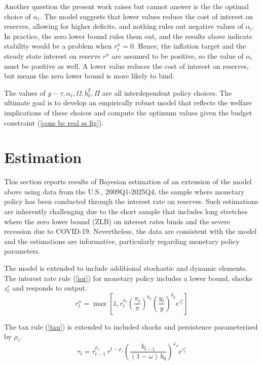 \documentclass[]{article}
\begin{document}
Another question the present work raises but cannot answer is the the optimal choice of $\alpha_{i}$. The model suggests that lower values reduce the cost of interest on reserves, allowing for higher deficits, and nothing rules out negative values of $\alpha_{i}$. In practice, the zero lower bound rules them out, and the results above indicate stability would be a problem when $r^{n}_{t}=0$. Hence, the inflation target and the steady state interest on reserve $r^{n}$ are assumed to be positive, so the value of $\alpha_{i}$ must be positive as well. A lower value reduces the cost of interest on reserves, but means the zero lower bound is more likely to bind. 

The values of $g-\tau, \alpha_{i}, \Omega, b_{0}^{T},\Pi$ are all interdependent policy choices. The ultimate goal is to develop an empirically robust model that reflects the welfare implications of these choices and compute the optimum values given the budget constraint (\ref{cons bc real ss fig}).

\section{Estimation}

This section reports results of Bayesian estimation of an extension of the model above using data from the U.S., 2009Q1-2025Q4, the sample where monetary policy has been conducted through the interest rate on reserves. Such estimations are inherently challenging due to the short sample that includes long stretches where the zero lower bound (ZLB) on interest rates binds and the severe recession due to COVID-19. Nevertheless, the data are consistent with the model and the estimations are informative, particularly regarding monetary policy parameters.

The model is extended to include additional stochastic and dynamic elements. The interest rate rule (\ref{ior}) for monetary policy includes a lower bound, shocks $z^r_t$ and responds to output.
\begin{equation}
  r^{n}_{t} = \max\left[1,r_{t}^{a_i}\left(\frac{\pi_t}{\pi}\right)^{b_\pi}\left(\frac{y_t}{y}\right)^{b_y} e^{z^r_t}\right]
  \label{iorest}
\end{equation}

The tax rule (\ref{tau}) is extended to included shocks and persistence parameterized by $\rho_\tau$.
\begin{equation}
   \tau_t = \tau_{t-1}^{\rho_\tau}\,\tau^{1-\rho_\tau}\left(\frac{b_{t-1}}{(1-\omega)\,b_0}\right)^{\!\varphi_b} e^{\varepsilon^\tau_t}
  \label{tauest}
\end{equation}
\end{document}
